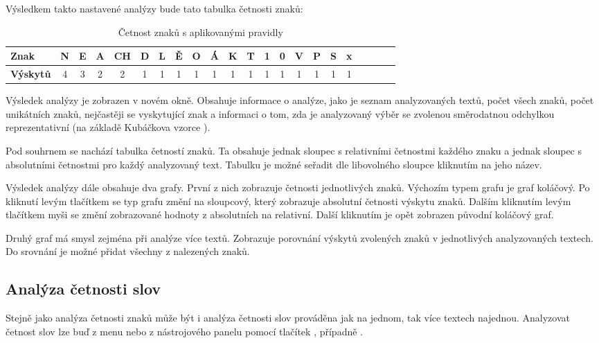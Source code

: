 \documentclass[dp.tex]{subfiles}
\begin{document}
Výsledkem takto nastavené analýzy bude tato tabulka četnosti znaků:

\begin{table}[H]
\caption {Četnost znaků s aplikovanými pravidly} 
\label{tab:title} 
\centering
	\begin{tabular}{|l|c|c|c|c|c|c|c|c|c|c|c|c|c|c|c|c|c|c|c|c|c|}


	\hline \textbf{Znak} & N & E & A & CH & D & L & Ě & O & Á & K & T & 1 & 0 & V & P & S & x \\
	\hline \textbf{Výskytů} & 4 & 3 & 2 & 2 & 1 & 1 & 1 & 1 & 1 & 1 & 1 & 1 & 1 & 1 & 1 & 1 & 1 \\ 
	\hline 
	\end{tabular} 
\end{table} 

Výsledek analýzy je zobrazen v novém okně. Obsahuje informace o analýze, jako je seznam analyzovaných textů, počet všech znaků, počet unikátních znaků, nejčastěji se vyskytující znak a informaci o tom, zda je analyzovaný výběr se zvolenou směrodatnou odchylkou reprezentativní (na základě Kubáčkova vzorce%
). 

Pod souhrnem se nachází tabulka četností znaků. Ta obsahuje jednak sloupec s relativními četnostmi každého znaku a jednak sloupec s absolutními četnostmi pro každý analyzovaný text. Tabulku je možné seřadit dle libovolného sloupce kliknutím na jeho název.

Výsledek analýzy dále obsahuje dva grafy. První z nich zobrazuje četnosti jednotlivých znaků. Výchozím typem grafu je graf koláčový. Po kliknutí levým tlačítkem se typ grafu změní na sloupcový, který zobrazuje absolutní četnosti výskytu znaků. Dalším kliknutím levým tlačítkem myši se změní zobrazované hodnoty z absolutních na relativní. Další kliknutím je opět zobrazen původní koláčový graf.

Druhý graf má smysl zejména při analýze více textů. Zobrazuje porovnání výskytů zvolených znaků v jednotlivých analyzovaných textech. Do srovnání je možné přidat všechny z nalezených znaků.

\subsection{Analýza četnosti slov}

Stejně jako analýza četnosti znaků může být i analýza četnosti slov prováděna jak na jednom, tak více textech najednou. Analyzovat četnost slov lze buď z menu  nebo z nástrojového panelu pomocí tlačítek , případně .
\end{document}
